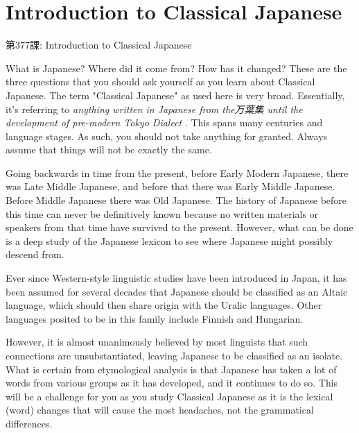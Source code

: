     
\chapter{Introduction to Classical Japanese}

\begin{center}
\begin{Large}
第377課: Introduction to Classical Japanese 
\end{Large}
\end{center}
 
\par{ What is Japanese? Where did it come from? How has it changed? These are the three questions that you should ask yourself as you learn about Classical Japanese. The term "Classical Japanese" as used here is very broad. Essentially, it's referring to \emph{anything written in Japanese from the万葉集 until the development of pre-modern Tokyo Dialect }. This spans many centuries and language stages. As such, you should not take anything for granted. Always assume that things will not be exactly the same. }

\par{ Going backwards in time from the present, before Early Modern Japanese, there was Late Middle Japanese, and before that there was Early Middle Japanese. Before Middle Japanese there was Old Japanese. The history of Japanese before this time can never be definitively known because no written materials or speakers from that time have survived to the present. However, what can be done is a deep study of the Japanese lexicon to see where Japanese might possibly descend from. }

\par{ Ever since Western-style linguistic studies have been introduced in Japan, it has been assumed for several decades that Japanese should be classified as an Altaic language, which should then share origin with the Uralic languages. Other languages posited to be in this family include Finnish and Hungarian. }

\par{ However, it is almost unanimously believed by most linguists that such connections are unsubstantiated, leaving Japanese to be classified as an isolate. What is certain from etymological analysis is that Japanese has taken a lot of words from various groups as it has developed, and it continues to do so. This will be a challenge for you as you study Classical Japanese as it is the lexical (word) changes that will cause the most headaches, not the grammatical differences. }

